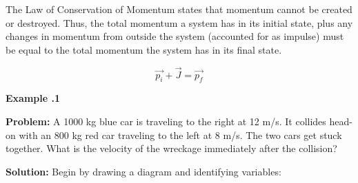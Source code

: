 	The Law of Conservation of Momentum states that momentum cannot be created or destroyed.  Thus, the total momentum a system has in its initial state, plus any changes in momentum from outside the system (accounted for as impulse) must be equal to the total momentum the system has in its final state.
	
	
	\begin{mdframed}[backgroundcolor=orange!20!white]
		\begin{equation}
			\vec{p_i} + \vec{J} = \vec{p_f}
			\label{eqn:ConservationofMomentum}
		\end{equation}
	\end{mdframed}
	

	 \begin{mdframed}[backgroundcolor=blue!10!white]
	\begin{center}
	\textbf{Example \thesection.1}	
	\end{center}
	
	\textbf{Problem: } A 1000 kg blue car is traveling to the right at 12 m/s.  It collides head-on with an 800 kg red car traveling to the left at 8 m/s.  The two cars get stuck together.  What is the velocity of the wreckage immediately after the collision?
	
	\vspace{0.1in}
	
	\textbf{Solution:} 
	Begin by drawing a diagram and identifying variables:
	\begin{center}
\end{center}
\end{mdframed}

